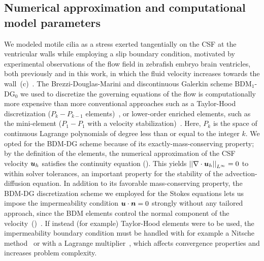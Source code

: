 \documentclass{WileyMSP-template}
\begin{document}
\subsection{Numerical approximation and computational model parameters}
We modeled motile cilia as a stress
exerted tangentially on the CSF at the ventricular walls
while employing a slip boundary condition,
motivated by experimental observations of the
flow field in zebrafish embryo brain ventricles, both previously and in this work, in which
the fluid velocity increases towards the
wall~(c)~\cite{Olstad2019CiliaryDevelopment}. 
The Brezzi-Douglas-Marini and discontinuous Galerkin scheme
$\mathrm{BDM}_1$-$\mathrm{DG}_0$
we used to discretize the governing equations of the flow
is computationally more expensive
than more conventional approaches such as a
Taylor-Hood discretization
($P_k-P_{k-1}$ elements)~\cite{Stenberg1990ErrorProblem}, or lower-order enriched
elements, such as the mini-element
($P_1-P_1$ with a velocity stabilization)~\cite{Brezzi2011MixedMethods}.
Here, $P_k$ is the space of continuous Lagrange polynomials of degree less
than or equal to the integer $k$.
We opted for the BDM-DG scheme because of its exactly-mass-conserving property;
by the definition of the elements, the numerical approximation of
the CSF velocity $\bm{u}_h$ satisfies the continuity equation ().
This yields ${\vert\vert\nabla\cdot\bm{u}_h\vert\vert}_{L^{\infty}}=0$ to within solver tolerances,
an important property for the stability of the advection-diffusion
equation\cite{cesmelioglu2022compatible, johnson2009numerical}.
In addition to its favorable mass-conserving property,
the BDM-DG discretization scheme 
we employed for the Stokes equations
lets us impose the impermeability condition $\bm{u}\cdot\bm{n}=0$
strongly without any tailored approach,
since the BDM elements control the normal component of the 
velocity~()~\cite{Brezzi1985TwoProblems}.
If instead (for example) Taylor-Hood
elements were to be used, the impermeability boundary condition must
be handled with for example a Nitsche method~\cite{Nitsche1971UberSind}
or with a Lagrange multiplier~\cite{Babuska1973TheMultipliers,
Bertoluzza2017BoundaryHemodynamics}, which affects
convergence properties and increases problem complexity.
\end{document}
